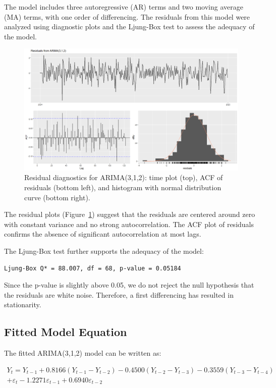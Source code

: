 \documentclass{article}
\begin{document}
The model includes three autoregressive (AR) terms and two moving average (MA) terms, with one order of differencing. The residuals from this model were analyzed using diagnostic plots and the Ljung-Box test to assess the adequacy of the model.

\begin{figure}
  \includegraphics[width=\textwidth]{finalproject/images/arima-residuals.png}
  \caption{Residual diagnostics for ARIMA(3,1,2): time plot (top), ACF of residuals (bottom left), and histogram with normal distribution curve (bottom right).}
  \label{fig:arima_residuals}
\end{figure}

The residual plots (Figure~\ref{fig:arima_residuals}) suggest that the residuals are centered around zero with constant variance and no strong autocorrelation. The ACF plot of residuals confirms the absence of significant autocorrelation at most lags.

The Ljung-Box test further supports the adequacy of the model:

\begin{verbatim}
Ljung-Box Q* = 88.007, df = 68, p-value = 0.05184
\end{verbatim}

Since the p-value is slightly above 0.05, we do not reject the null hypothesis that the residuals are white noise. Therefore, a first differencing has resulted in stationarity.

\subsection*{Fitted Model Equation}

The fitted ARIMA(3,1,2) model can be written as:

\begin{multline}
Y_t = Y_{t-1} 
+ 0.8166 (Y_{t-1} - Y_{t-2}) 
- 0.4500 (Y_{t-2} - Y_{t-3}) 
- 0.3559 (Y_{t-3} - Y_{t-4}) \\
+ \varepsilon_t 
- 1.2271 \varepsilon_{t-1} 
+ 0.6940 \varepsilon_{t-2}
\end{multline}
\end{document}
